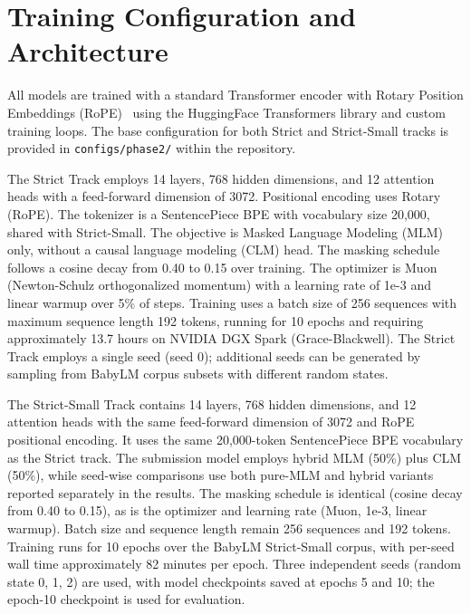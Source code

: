 
\section{Training Configuration and Architecture}

All models are trained with a standard Transformer encoder with Rotary Position Embeddings (RoPE)~\cite{Su2021RoPE} using the HuggingFace Transformers library and custom training loops. The base configuration for both Strict and Strict-Small tracks is provided in \texttt{configs/phase2/} within the repository.

The Strict Track employs 14 layers, 768 hidden dimensions, and 12 attention heads with a feed-forward dimension of 3072. Positional encoding uses Rotary (RoPE). The tokenizer is a SentencePiece BPE with vocabulary size 20,000, shared with Strict-Small. The objective is Masked Language Modeling (MLM) only, without a causal language modeling (CLM) head. The masking schedule follows a cosine decay from 0.40 to 0.15 over training. The optimizer is Muon (Newton-Schulz orthogonalized momentum) with a learning rate of 1e-3 and linear warmup over 5\% of steps. Training uses a batch size of 256 sequences with maximum sequence length 192 tokens, running for 10 epochs and requiring approximately 13.7 hours on NVIDIA DGX Spark (Grace-Blackwell). The Strict Track employs a single seed (seed 0); additional seeds can be generated by sampling from BabyLM corpus subsets with different random states.

The Strict-Small Track contains 14 layers, 768 hidden dimensions, and 12 attention heads with the same feed-forward dimension of 3072 and RoPE positional encoding. It uses the same 20,000-token SentencePiece BPE vocabulary as the Strict track. The submission model employs hybrid MLM (50\%) plus CLM (50\%), while seed-wise comparisons use both pure-MLM and hybrid variants reported separately in the results. The masking schedule is identical (cosine decay from 0.40 to 0.15), as is the optimizer and learning rate (Muon, 1e-3, linear warmup). Batch size and sequence length remain 256 sequences and 192 tokens. Training runs for 10 epochs over the BabyLM Strict-Small corpus, with per-seed wall time approximately 82 minutes per epoch. Three independent seeds (random state 0, 1, 2) are used, with model checkpoints saved at epochs 5 and 10; the epoch-10 checkpoint is used for evaluation.

